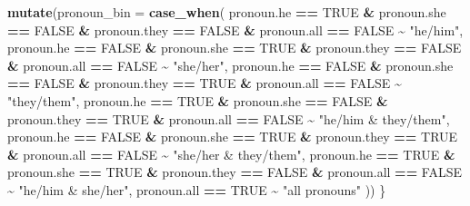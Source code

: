 \documentclass[12pt,twoside]{reedthesis}
\newenvironment{Shaded}{\begin{snugshade}}{\end{snugshade}}
\newcommand{\DataTypeTok}[1]{\textcolor[rgb]{0.13,0.29,0.53}{#1}}
\newcommand{\KeywordTok}[1]{\textcolor[rgb]{0.13,0.29,0.53}{\textbf{#1}}}
\newcommand{\NormalTok}[1]{#1}
\newcommand{\OperatorTok}[1]{\textcolor[rgb]{0.81,0.36,0.00}{\textbf{#1}}}
\newcommand{\OtherTok}[1]{\textcolor[rgb]{0.56,0.35,0.01}{#1}}
\newcommand{\StringTok}[1]{\textcolor[rgb]{0.31,0.60,0.02}{#1}}
\begin{document}
\begin{Shaded}
\begin{Highlighting}[]
\StringTok{    }\KeywordTok{mutate}\NormalTok{(}\DataTypeTok{pronoun\_bin =} \KeywordTok{case\_when}\NormalTok{(}
\NormalTok{      pronoun.he }\OperatorTok{==}\StringTok{ }\OtherTok{TRUE} \OperatorTok{\&}\StringTok{ }\NormalTok{pronoun.she }\OperatorTok{==}\StringTok{ }\OtherTok{FALSE} \OperatorTok{\&}\StringTok{ }\NormalTok{pronoun.they }\OperatorTok{==}\StringTok{ }\OtherTok{FALSE} \OperatorTok{\&}\StringTok{ }\NormalTok{pronoun.all }\OperatorTok{==}\StringTok{ }\OtherTok{FALSE} \OperatorTok{\textasciitilde{}}\StringTok{ "he/him"}\NormalTok{,}
\NormalTok{      pronoun.he }\OperatorTok{==}\StringTok{ }\OtherTok{FALSE} \OperatorTok{\&}\StringTok{ }\NormalTok{pronoun.she }\OperatorTok{==}\StringTok{ }\OtherTok{TRUE} \OperatorTok{\&}\StringTok{ }\NormalTok{pronoun.they }\OperatorTok{==}\StringTok{ }\OtherTok{FALSE} \OperatorTok{\&}\StringTok{ }\NormalTok{pronoun.all }\OperatorTok{==}\StringTok{ }\OtherTok{FALSE} \OperatorTok{\textasciitilde{}}\StringTok{ "she/her"}\NormalTok{,}
\NormalTok{      pronoun.he }\OperatorTok{==}\StringTok{ }\OtherTok{FALSE} \OperatorTok{\&}\StringTok{ }\NormalTok{pronoun.she }\OperatorTok{==}\StringTok{ }\OtherTok{FALSE} \OperatorTok{\&}\StringTok{ }\NormalTok{pronoun.they }\OperatorTok{==}\StringTok{ }\OtherTok{TRUE} \OperatorTok{\&}\StringTok{ }\NormalTok{pronoun.all }\OperatorTok{==}\StringTok{ }\OtherTok{FALSE} \OperatorTok{\textasciitilde{}}\StringTok{ "they/them"}\NormalTok{,}
\NormalTok{      pronoun.he }\OperatorTok{==}\StringTok{ }\OtherTok{TRUE} \OperatorTok{\&}\StringTok{ }\NormalTok{pronoun.she }\OperatorTok{==}\StringTok{ }\OtherTok{FALSE} \OperatorTok{\&}\StringTok{ }\NormalTok{pronoun.they }\OperatorTok{==}\StringTok{ }\OtherTok{TRUE} \OperatorTok{\&}\StringTok{ }\NormalTok{pronoun.all }\OperatorTok{==}\StringTok{ }\OtherTok{FALSE} \OperatorTok{\textasciitilde{}}\StringTok{ "he/him \& they/them"}\NormalTok{,}
\NormalTok{      pronoun.he }\OperatorTok{==}\StringTok{ }\OtherTok{FALSE} \OperatorTok{\&}\StringTok{ }\NormalTok{pronoun.she }\OperatorTok{==}\StringTok{ }\OtherTok{TRUE} \OperatorTok{\&}\StringTok{ }\NormalTok{pronoun.they }\OperatorTok{==}\StringTok{ }\OtherTok{TRUE} \OperatorTok{\&}\StringTok{ }\NormalTok{pronoun.all }\OperatorTok{==}\StringTok{ }\OtherTok{FALSE} \OperatorTok{\textasciitilde{}}\StringTok{ "she/her \& they/them"}\NormalTok{,}
\NormalTok{      pronoun.he }\OperatorTok{==}\StringTok{ }\OtherTok{TRUE} \OperatorTok{\&}\StringTok{ }\NormalTok{pronoun.she }\OperatorTok{==}\StringTok{ }\OtherTok{TRUE} \OperatorTok{\&}\StringTok{ }\NormalTok{pronoun.they }\OperatorTok{==}\StringTok{ }\OtherTok{FALSE} \OperatorTok{\&}\StringTok{ }\NormalTok{pronoun.all }\OperatorTok{==}\StringTok{ }\OtherTok{FALSE} \OperatorTok{\textasciitilde{}}\StringTok{ "he/him \& she/her"}\NormalTok{,}
\NormalTok{      pronoun.all }\OperatorTok{==}\StringTok{ }\OtherTok{TRUE} \OperatorTok{\textasciitilde{}}\StringTok{ "all pronouns"}
\NormalTok{    ))}
\NormalTok{\}}


\end{Highlighting}
\end{Shaded}
\end{document}
